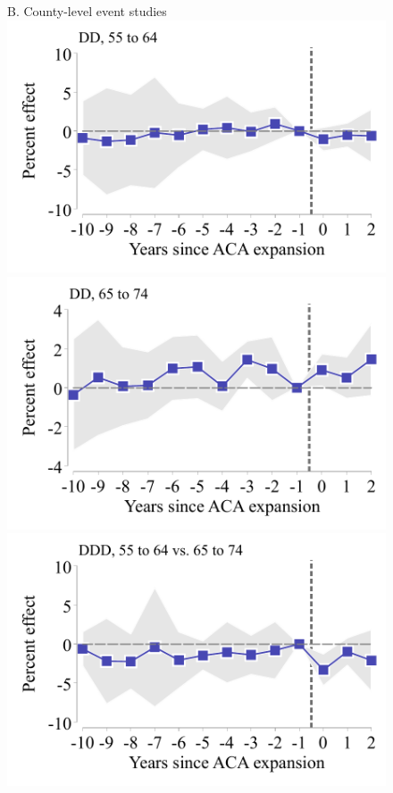 \documentclass[12pt]{article}%
\begin{document}
\begin{figure}
\begin{minipage}[b]{0.45\linewidth}
  \end{minipage}
  \hspace{0.1cm}
  \begin{minipage}[b]{0.45\linewidth}
   B. County-level event studies \\
  \centering
  \includegraphics[width=\textwidth]{../output/figures/event_study_55_64_ln_amenable_attpop.pdf}
  \includegraphics[width=\textwidth]{../output/figures/event_study_65_74_ln_amenable_attpop.pdf}
  \includegraphics[width=\textwidth]{../output/figures/event_study_ddd_ln_amenable_attpop.pdf}

\end{minipage}
\end{figure}
\end{document}
